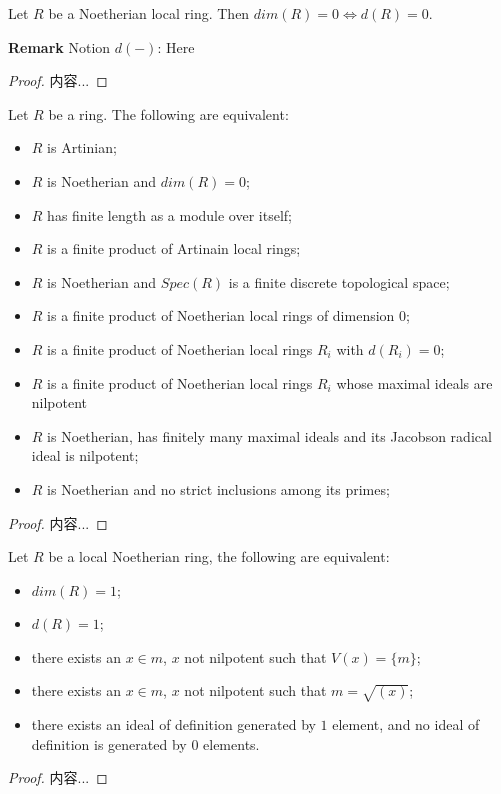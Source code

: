 \documentclass[Total.tex]{subfiles}
\begin{document}
			\begin{lemma}
				Let $R$ be a Noetherian local ring. Then $dim(R)=0\Leftrightarrow d(R)=0$.
			\end{lemma}
			\textbf{Remark} Notion $d(-)$: Here 
			\begin{proof}
				内容...
			\end{proof}
			\begin{proposition}
				Let $R$ be a ring. The following are equivalent:
				
				\begin{itemize}
					\item $R$ is Artinian;
					\item $R$ is Noetherian and $dim(R)=0$;
					\item $R$ has finite length as a module over itself;
					\item $R$ is a finite product of Artinain local rings;
					\item $R$ is Noetherian and $Spec(R)$ is a finite discrete topological space;
					\item $R$ is a finite product of Noetherian local rings of dimension $0$;
					\item $R$ is a finite product of Noetherian local rings $R_i$ with $d(R_i)=0$;
					\item $R$ is a finite product of Noetherian local rings $R_i$ whose maximal ideals are nilpotent
					\item $R$ is Noetherian, has finitely many maximal ideals and its Jacobson radical ideal is nilpotent;
					\item $R$ is Noetherian and no strict inclusions among its primes;
				\end{itemize}
			\end{proposition}
			\begin{proof}
				内容...
			\end{proof}
			
			\begin{lemma}
				Let $R$ be a local Noetherian ring, the following are equivalent:
				\begin{itemize}
					\item $dim(R)=1$;
					\item $d(R)=1$;
					\item there exists an $x\in m$, $x$ not nilpotent such that $V(x)=\{m\}$;
					\item there exists an $x\in m$, $x$ not nilpotent such that $m=\sqrt{(x)}$;
					\item there exists an ideal of definition generated by $1$ element, and no ideal of definition is generated by $0$ elements.
				\end{itemize}
			\end{lemma}
			\begin{proof}
				内容...
			\end{proof}
			
\end{document}
